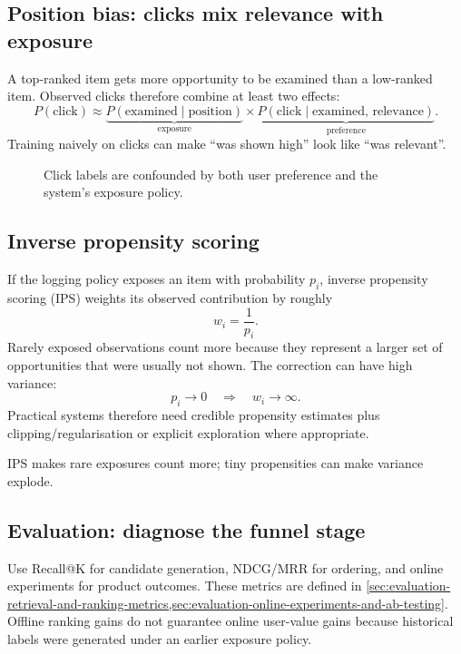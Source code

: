 \subsection{Position bias: clicks mix relevance with exposure}
\label{sec:ranking-position-bias}
A top-ranked item gets more opportunity to be examined than a low-ranked item.
Observed clicks therefore combine at least two effects:
\[
\boxed{
P(\text{click})
\approx
\underbrace{P(\text{examined}\mid\text{position})}_{\text{exposure}}
\times
\underbrace{P(\text{click}\mid\text{examined, relevance})}_{\text{preference}}.
}
\]
Training naively on clicks can make ``was shown high'' look like ``was relevant''.

\begin{figure}[htbp]
\centering
{}
\caption{Click labels are confounded by both user preference and the system's exposure policy.}
\end{figure}

\subsection{Inverse propensity scoring}
\label{sec:ranking-ips}
If the logging policy exposes an item with probability $p_i$, inverse propensity scoring (IPS) weights its observed contribution by roughly
\[
\boxed{
w_i
=
\frac{1}{p_i}.
}
\]
Rarely exposed observations count more because they represent a larger set of opportunities that were usually not shown.
The correction can have high variance:
\[
p_i\rightarrow0
\quad\Rightarrow\quad
w_i\rightarrow\infty.
\]
Practical systems therefore need credible propensity estimates plus clipping/regularisation or explicit exploration where appropriate.

\begin{calloutmemoryhook}
IPS makes rare exposures count more; tiny propensities can make variance explode.
\end{calloutmemoryhook}

\subsection{Evaluation: diagnose the funnel stage}
\label{sec:ranking-evaluation}
Use Recall@K for candidate generation, NDCG/MRR for ordering, and online experiments for product outcomes.
These metrics are defined in \cref{sec:evaluation-retrieval-and-ranking-metrics,sec:evaluation-online-experiments-and-ab-testing}.
Offline ranking gains do not guarantee online user-value gains because historical labels were generated under an earlier exposure policy.

